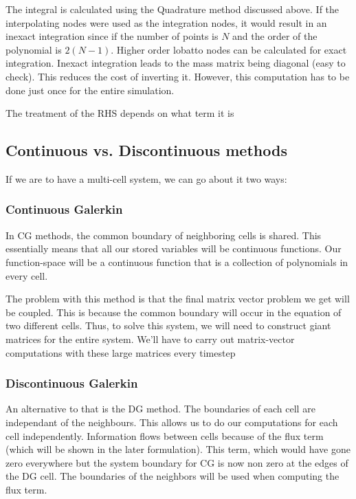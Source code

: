 \documentclass[11pt]{article}
\begin{document}
The integral is calculated using the Quadrature method discussed above.
If the interpolating nodes were used as the integration nodes, it would
result in an inexact integration since if the number of points is \(N\)
and the order of the polynomial is \(2(N-1)\). Higher order lobatto
nodes can be calculated for exact integration. Inexact integration leads
to the mass matrix being diagonal (easy to check). This reduces the cost
of inverting it. However, this computation has to be done just once for
the entire simulation.

The treatment of the RHS depends on what term it is

\subsection{Continuous vs. Discontinuous
methods}\label{continuous-vs.-discontinuous-methods}

If we are to have a multi-cell system, we can go about it two ways:

\subsubsection{Continuous Galerkin}\label{continuous-galerkin}

In CG methods, the common boundary of neighboring cells is shared. This
essentially means that all our stored variables will be continuous
functions. Our function-space will be a continuous function that is a
collection of polynomials in every cell.

The problem with this method is that the final matrix vector problem we
get will be coupled. This is because the common boundary will occur in
the equation of two different cells. Thus, to solve this system, we will
need to construct giant matrices for the entire system. We'll have to
carry out matrix-vector computations with these large matrices every
timestep

\subsubsection{Discontinuous Galerkin}\label{discontinuous-galerkin}

An alternative to that is the DG method. The boundaries of each cell are
independant of the neighbours. This allows us to do our computations for
each cell independently. Information flows between cells because of the
flux term (which will be shown in the later formulation). This term,
which would have gone zero everywhere but the system boundary for CG is
now non zero at the edges of the DG cell. The boundaries of the
neighbors will be used when computing the flux term.
\end{document}
